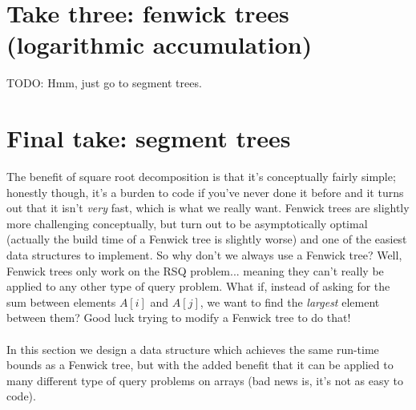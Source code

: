 \documentclass[11pt]{article}
\theoremstyle{plain}
\theoremstyle{definition}
\begin{document}
\section{Take three: fenwick trees (logarithmic accumulation)}
TODO: Hmm, just go to segment trees.
\section{Final take: segment trees}
The benefit of square root decomposition is that it's conceptually fairly simple; honestly though, it's a burden to code if you've never done it before and it turns out that it isn't \emph{very} fast, which is what we really want. Fenwick trees are slightly more challenging conceptually, but turn out to be asymptotically optimal (actually the build time of a Fenwick tree is slightly worse) and one of the easiest data structures to implement. So why don't we always use a Fenwick tree? Well, Fenwick trees only work on the RSQ problem... meaning they can't really be applied to any other type of query problem. What if, instead of asking for the sum between elements $A[i]$ and $A[j]$, we want to find the \emph{largest} element between them? Good luck trying to modify a Fenwick tree to do that!\\\\
In this section we design a data structure which achieves the same run-time bounds as a Fenwick tree, but with the added benefit that it can be applied to many different type of query problems on arrays (bad news is, it's not as easy to code). 
\end{document}
